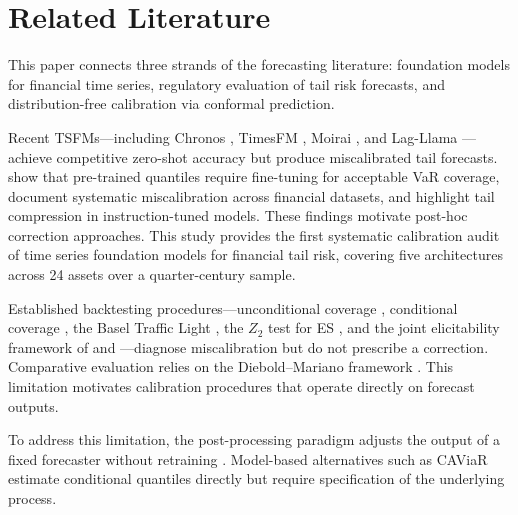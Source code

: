 \documentclass[preprint,11pt,authoryear]{elsarticle}
\newcommand{\1}{\boldsymbol{1}}
\begin{document}
	\section{Related Literature}
	\label{sec:lit}
	
	This paper connects three strands of the forecasting literature:
	foundation models for financial time series, regulatory
	evaluation of tail risk forecasts, and distribution-free
	calibration via conformal prediction.
	
	Recent TSFMs---including Chronos
	\citep{ansari2024chronos,ansari2025chronos2}, TimesFM
	\citep{das2024timesfm}, Moirai
	\citep{woo2024moirai,liu2024moirai2}, and Lag-Llama
	\citep{rasul2024lagllama}---achieve competitive zero-shot
	accuracy but produce miscalibrated tail forecasts.
	\citet{goel2024tsfmvar} show that pre-trained quantiles
	require fine-tuning for acceptable VaR coverage,
	\citet{rahimikia2025revisiting} document systematic
	miscalibration across financial datasets, and
	\citet{pele2025llmvar} highlight tail compression in
	instruction-tuned models. These findings motivate post-hoc
	correction approaches. This study provides the first systematic
	calibration audit of time series foundation models for financial
	tail risk, covering five architectures across 24 assets over a
	quarter-century sample.

	Established backtesting procedures---unconditional coverage
	\citep{kupiec1995}, conditional coverage
	\citep{christoffersen1998}, the Basel Traffic Light
	\citep{basel1996}, the $Z_2$ test for ES
	\citep{acerbi2014back}, and the joint elicitability framework
	of \citet{fissler2016higher} and
	\citet{nolde2017elicitability}---diagnose miscalibration but
	do not prescribe a correction. Comparative evaluation relies
	on the Diebold--Mariano framework
	\citep{diebold1995comparing,harvey1997testing}. This
	limitation motivates calibration procedures that operate
	directly on forecast outputs.
	
	To address this limitation, the post-processing paradigm adjusts
	the output of a fixed forecaster without retraining
	\citep{gneiting2013combining, brehmer2021properification,
		taillardat2016calibrated}. Model-based
	alternatives such as CAViaR \citep{engle2004caviar} estimate
	conditional quantiles directly but require specification of
	the underlying process.
	
\end{document}
